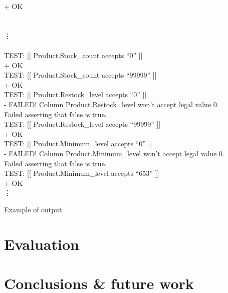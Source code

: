 \documentclass[sigconf, authordraft]{acmart}
\begin{document}
\begin{table}
\begin{tabbing}
        \>  \textcolor{test green}{+ OK} \\
         \\[\codeskip]
         \\[\dotvskip]
        \hspace*{\dothskip}\vdots \\
         \\[\codeskip]
        TEST: [[ Product.Stock\_count accepts ``0'' ]]  \\
        \>  \textcolor{test green}{+ OK} \\
        TEST: [[ Product.Stock\_count accepts ``99999'' ]]  \\
        \>  \textcolor{test green}{+ OK} \\
        TEST: [[ Product.Restock\_level accepts ``0'' ]]  \\
        \>  \textcolor{test red}{- FAILED! Column Product.Restock\_level won't accept legal value 0.} \\
        \textcolor{test red}{Failed asserting that false is true.} \\
        TEST: [[ Product.Restock\_level accepts ``99999'' ]]  \\
        \>  \textcolor{test green}{+ OK} \\
        TEST: [[ Product.Minimum\_level accepts ``0'' ]]  \\
        \>  \textcolor{test red}{- FAILED! Column Product.Minimum\_level won't accept legal value 0.} \\
        \textcolor{test red}{Failed asserting that false is true.} \\
        TEST: [[ Product.Minimum\_level accepts ``653'' ]]  \\
        \>  \textcolor{test green}{+ OK} \\[\dotvskip]
        \hspace*{\dothskip}\vdots \\
    \end{tabbing}
    \caption{Example of output}
\end{table}

\section{Evaluation}
\label{sec-evaluation}

\section{Conclusions \& future work}
\label{sec-conclusion}

\newpage


\end{document}
